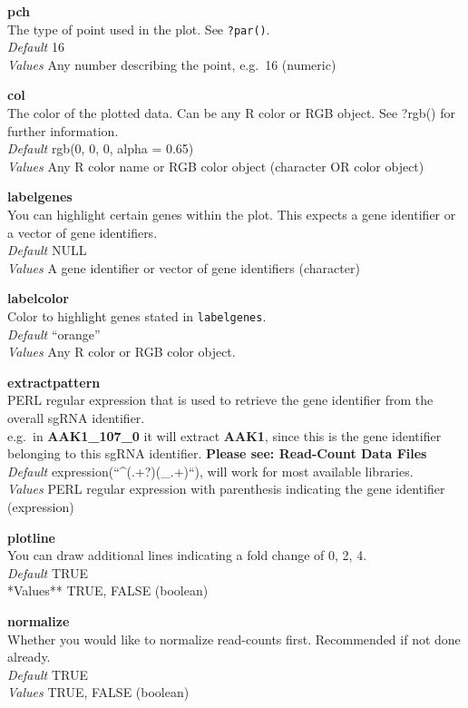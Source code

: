 \documentclass[]{article}
\begin{document}
\textbf{pch}\\
The type of point used in the plot. See \texttt{?par()}.\\
\emph{Default} 16\\
\emph{Values} Any number describing the point, e.g.~16 (numeric)

\textbf{col}\\
The color of the plotted data. Can be any R color or RGB object. See
?rgb() for further information.\\
\emph{Default} rgb(0, 0, 0, alpha = 0.65)\\
\emph{Values} Any R color name or RGB color object (character OR color
object)

\textbf{labelgenes}\\
You can highlight certain genes within the plot. This expects a gene
identifier or a vector of gene identifiers.\\
\emph{Default} NULL\\
\emph{Values} A gene identifier or vector of gene identifiers
(character)

\textbf{labelcolor}\\
Color to highlight genes stated in \texttt{labelgenes}.\\
\emph{Default} ``orange''\\
\emph{Values} Any R color or RGB color object.

\textbf{extractpattern}\\
PERL regular expression that is used to retrieve the gene identifier
from the overall sgRNA identifier.\\
e.g.~in \textbf{AAK1\_107\_0} it will extract \textbf{AAK1}, since this
is the gene identifier belonging to this sgRNA identifier.
\textbf{Please see: Read-Count Data Files}\\
\emph{Default} expression(``\^{}(.+?)(\_.+)``), will work for most
available libraries.\\
\emph{Values} PERL regular expression with parenthesis indicating the
gene identifier (expression)

\textbf{plotline}\\
You can draw additional lines indicating a fold change of 0, 2, 4.\\
\emph{Default} TRUE\\
*Values** TRUE, FALSE (boolean)

\textbf{normalize}\\
Whether you would like to normalize read-counts first. Recommended if
not done already.\\
\emph{Default} TRUE\\
\emph{Values} TRUE, FALSE (boolean)
\end{document}
